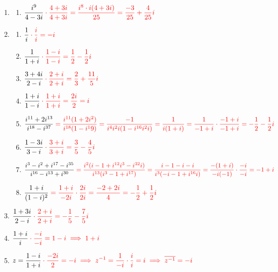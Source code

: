 \documentclass[12pt, openright, a4paper, twoside, english, brazil]{article}
\newenvironment{qitem}{
  \color{black}
\item}{\vspace{10pt}}
\newenvironment{qmitem}{
  \color{black}
\item
\begin{enumerate}[\bfseries a)]}{
\end{enumerate}\vspace{10pt}}
\begin{document}
\begin{enumerate}[\bfseries 1.]
\begin{qmitem}
  \item $\displaystyle
    \frac{i^9}{4-3i}\color{red}\cdot\frac{4+3i}{4+3i}=\frac{i^8\cdot
    i(4+3i)}{25}=\frac{-3}{25}+\frac{4}{25}i$
  \end{qmitem}

  \begin{qmitem} %
  \item $\displaystyle \frac{1}{i}\color{red}\cdot\frac{i}{i}=-i$

  \item $\displaystyle
    \frac{1}{1+i}\color{red}\cdot\frac{1-i}{1-i}=\frac12-\frac12i$

  \item $\displaystyle
    \frac{3+4i}{2-i}\color{red}\cdot\frac{2+i}{2+i}=\frac23+\frac{11}5i$

  \item $\displaystyle
    \frac{1+i}{1-i}\color{red}\cdot\frac{1+i}{1+i}=\frac{2i}2=i$

  \item $\displaystyle
    \frac{i^{11}+2i^{13}}{i^{18}-i^{37}}\color{red}=\frac{i^{11}(1+2i^2)}{i^{18}(1-i^19)}=\frac{-1}{i^4i^2i(1-i^{16}i^2i)}=\frac{1}{i(1+i)}=\frac{1}{-1+i}\cdot\frac{-1+i}{-1+i}=-\frac12-\frac12i$

  \item $\displaystyle
    \frac{1-3i}{3-i}\color{red}\cdot\frac{3+i}{3+i}=\frac35-\frac45i$

  \item $\displaystyle
    \frac{i^3-i^2+i^{17}-i^{35}}{i^{16}-i^{13}+i^{30}}\color{red}=\frac{i^2(i-1+i^{12}i^3-i^{32}i)}{i^{13}(i^3-1+i^{17})}=\frac{i-1-i-i}{i^3(-i-1+i^{16}i)}=\frac{-(1+i)}{-i(-1)}\cdot\frac{-i}{-i}=-1+i$

  \item $\displaystyle
    \frac{1+i}{(1-i)^2}\color{red}=\frac{1+i}{-2i}\cdot\frac{2i}{2i}=\frac{-2+2i}{4}=-\frac12+\frac12i$
  \end{qmitem}

  \begin{qitem} %
    $\displaystyle
    \frac{1+3i}{2-i}\color{red}\cdot\frac{2+i}{2+i}=-\frac15-\frac75i$
  \end{qitem}

  \begin{qitem} %
    $\displaystyle
    \frac{1+i}{i}\color{red}\cdot\frac{-i}{-i}=1-i\implies 1+i$
  \end{qitem}

  \begin{qitem} %
    $\displaystyle
    z=\frac{1-i}{1+i}\color{red}\cdot\frac{-2i}{2}=-i\implies
    z^{-1}=\frac{1}{-i}\cdot\frac{i}{i}=i\implies \overline{z^{-1}}=-i$
  \end{qitem}


\end{enumerate}
\end{document}
